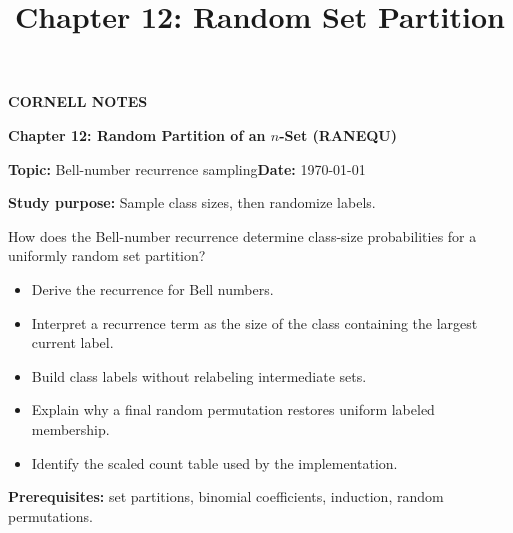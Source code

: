 \documentclass[10pt,letterpaper]{article}
\title{Chapter 12: Random Set Partition}
\author{}
\date{}
\begin{document}
\maketitle
\begin{tcolorbox}[colback=Paper,colframe=Ink]{\small\bfseries\color{Teal}CORNELL NOTES}\par{\raggedright\LARGE\bfseries Chapter 12: Random Partition of an $n$-Set (RANEQU)\par}\medskip\textbf{Topic:} Bell-number recurrence sampling\hfill\textbf{Date:} \today\par\textbf{Study purpose:} Sample class sizes, then randomize labels.\end{tcolorbox}
\begin{tcolorbox}[colback=Teal!5,colframe=Teal,title=Essential question]How does the Bell-number recurrence determine class-size probabilities for a uniformly random set partition?\end{tcolorbox}
\begin{tcolorbox}[colback=white,colframe=Mist,title=Learning objectives]\begin{itemize}\item Derive the recurrence for Bell numbers.\item Interpret a recurrence term as the size of the class containing the largest current label.\item Build class labels without relabeling intermediate sets.\item Explain why a final random permutation restores uniform labeled membership.\item Identify the scaled count table used by the implementation.\end{itemize}\textbf{Prerequisites:} set partitions, binomial coefficients, induction, random permutations.\end{tcolorbox}
\end{document}
